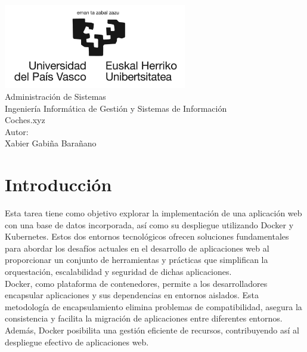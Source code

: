 \documentclass{report}
\begin{document}
    \begin{titlepage}
        \centering
        \includegraphics[width=0.6\textwidth]{./img/logo.jpg}\\
        \vspace{1cm}
        \LARGE Administración de Sistemas\\
        \vspace{0.5cm}
        \Large Ingeniería Informática de Gestión y Sistemas de Información\\
        \vspace{3cm}
        \Huge Coches.xyz\\
        \vspace{2.5cm}
        \Large Autor:\\
        \vspace{0.2cm}
        \large Xabier Gabiña Barañano\\
    \end{titlepage}
    \tableofcontents
    \chapter{Introducción}
        Esta tarea tiene como objetivo explorar la implementación de una aplicación web con una base de datos incorporada, así como su despliegue utilizando Docker y Kubernetes. Estos dos entornos tecnológicos ofrecen soluciones fundamentales para abordar los desafíos actuales en el desarrollo de aplicaciones web al proporcionar un conjunto de herramientas y prácticas que simplifican la orquestación, escalabilidad y seguridad de dichas aplicaciones.\\

        Docker, como plataforma de contenedores, permite a los desarrolladores encapsular aplicaciones y sus dependencias en entornos aislados. Esta metodología de encapsulamiento elimina problemas de compatibilidad, asegura la consistencia y facilita la migración de aplicaciones entre diferentes entornos. Además, Docker posibilita una gestión eficiente de recursos, contribuyendo así al despliegue efectivo de aplicaciones web.\\
        
\end{document}
